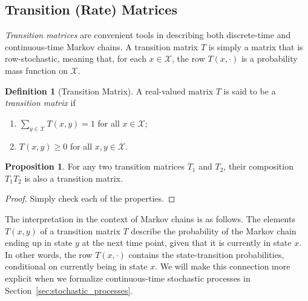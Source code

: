 \documentclass[10pt,a4paper]{paper}
\theoremstyle{definition}
\newtheorem{proposition}[theorem]{Proposition}
\newtheorem{definition}{Definition}
\newcommand{\states}{\mathcal{X}}
\begin{document}
\subsection{Transition (Rate) Matrices}\label{sec:trans_rate_matrices}

\emph{Transition matrices} are convenient tools in describing both discrete-time and continuous-time Markov chains. A transition matrix $T$ is simply a matrix that is row-stochastic, meaning that, for each $x\in\states$, the row $T(x,\cdot)$ is a probability mass function on $\states$.
\begin{definition}[Transition Matrix]\label{def:stoch_matrix}
A real-valued matrix $T$ is said to be a \emph{transition matrix} if
\vspace{5pt}
\begin{enumerate}[label=T\arabic*:,ref=T\arabic*]
\item\label{def:T:sumone}
$\sum_{y\in\states}T(x,y)=1$ for all $x\in\states$;\label{def:trans_matrix_is_stochastic}
\item\label{def:T:nonneg}
$T(x,y)\geq0$ for all $x,y\in\states$.
\end{enumerate}
\vspace{5pt}
\noindent
\end{definition}

\begin{proposition}\label{lemma:compositiontransitionmatrix}
For any two transition matrices $T_1$ and $T_2$, their composition $T_1T_2$ is also a transition matrix.
\end{proposition}
\begin{proof}
Simply check each of the properties.
\end{proof}

The interpretation in the context of Markov chains is as follows. The elements $T(x,y)$ of a transition matrix $T$ describe the probability of the Markov chain ending up in state $y$ at the next time point, given that it is currently in state $x$. In other words, the row $T(x,\cdot)$ contains the state-transition probabilities, conditional on currently being in state $x$. We will make this connection more explicit when we formalize continuous-time stochastic processes in Section~\ref{sec:stochastic_processes}.
\end{document}
